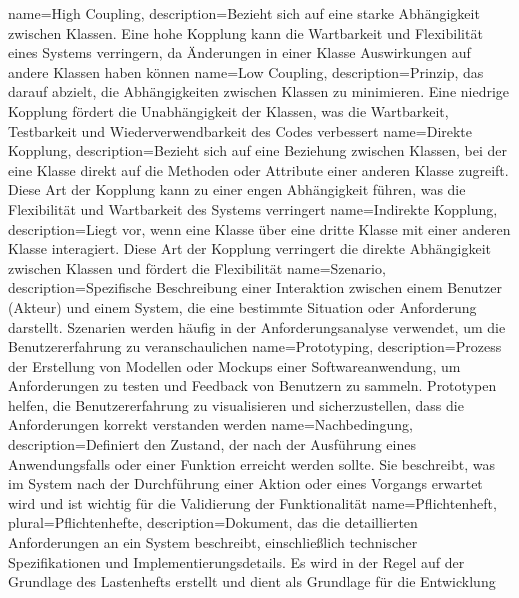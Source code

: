 {
    name={High Coupling},
    description={Bezieht sich auf eine starke Abhängigkeit zwischen Klassen. Eine hohe Kopplung kann die Wartbarkeit und Flexibilität eines Systems verringern, da Änderungen in einer Klasse Auswirkungen auf andere Klassen haben können}
}
{
    name={Low Coupling},
    description={Prinzip, das darauf abzielt, die Abhängigkeiten zwischen Klassen zu minimieren. Eine niedrige Kopplung fördert die Unabhängigkeit der Klassen, was die Wartbarkeit, Testbarkeit und Wiederverwendbarkeit des Codes verbessert}
}
{
    name={Direkte Kopplung},
    description={Bezieht sich auf eine Beziehung zwischen Klassen, bei der eine Klasse direkt auf die Methoden oder Attribute einer anderen Klasse zugreift. Diese Art der Kopplung kann zu einer engen Abhängigkeit führen, was die Flexibilität und Wartbarkeit des Systems verringert}
}
{
    name={Indirekte Kopplung},
    description={Liegt vor, wenn eine Klasse über eine dritte Klasse mit einer anderen Klasse interagiert. Diese Art der Kopplung verringert die direkte Abhängigkeit zwischen Klassen und fördert die Flexibilität}
}
{
    name={Szenario},
    description={Spezifische Beschreibung einer Interaktion zwischen einem Benutzer (Akteur) und einem System, die eine bestimmte Situation oder Anforderung darstellt. Szenarien werden häufig in der Anforderungsanalyse verwendet, um die Benutzererfahrung zu veranschaulichen}
}
{
    name={Prototyping},
    description={Prozess der Erstellung von Modellen oder Mockups einer Softwareanwendung, um Anforderungen zu testen und Feedback von Benutzern zu sammeln. Prototypen helfen, die Benutzererfahrung zu visualisieren und sicherzustellen, dass die Anforderungen korrekt verstanden werden}
}
{
    name={Nachbedingung},
    description={Definiert den Zustand, der nach der Ausführung eines Anwendungsfalls oder einer Funktion erreicht werden sollte. Sie beschreibt, was im System nach der Durchführung einer Aktion oder eines Vorgangs erwartet wird und ist wichtig für die Validierung der Funktionalität}
}
{
    name={Pflichtenheft},
    plural={Pflichtenhefte},
    description={Dokument, das die detaillierten Anforderungen an ein System beschreibt, einschließlich technischer Spezifikationen und Implementierungsdetails. Es wird in der Regel auf der Grundlage des Lastenhefts erstellt und dient als Grundlage für die Entwicklung}
}
